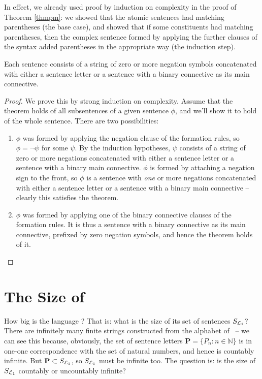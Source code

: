 In effect, we already used proof by induction on complexity in the proof of Theorem \ref{thmpm}: we showed that the atomic sentences had matching parentheses (the base case), and showed that if some constituents had matching parentheses, then the complex sentence formed by applying the further clauses of the syntax added parentheses in the appropriate way (the induction step). 

\begin{theorem}
Each sentence consists of a string of zero or more negation symbols concatenated with either a sentence letter or a sentence with a binary connective as its main connective.
\begin{proof}
	We prove this by strong induction on complexity. Assume that the theorem holds of all subsentences of a given sentence $\phi$, and we'll show it to hold of the whole sentence. There are two possibilities: \begin{enumerate}
		\item $\phi$ was formed by applying the negation clause of the formation rules, so $\phi = \neg\psi$ for some $\psi$. By the induction hypotheses, $\psi$ consists of a string of zero or more negations concatenated with either a sentence letter or a sentence with a binary main connective. $\phi$ is formed by attaching a negation sign to the front, so $\phi$ is a sentence with \emph{one} or more negations concatenated with either a sentence letter or a sentence with a binary main connective – clearly this satisfies the theorem.
		\item $\phi$ was formed by applying one of the binary connective clauses of the formation rules. It is thus a sentence with a binary connective as its main connective, prefixed by zero negation symbols, and hence the theorem holds of it.
	\end{enumerate}	
\end{proof}\end{theorem}



\section{The Size of \lone}

How big is the language \lone? That is: what is the size of its set of sentences $S_{\mathcal{L}_{1}}$? There are infinitely many finite strings constructed from the alphabet of \lone\ – we can see this because, obviously, the set of sentence letters $\mathbf{P}=\{P_{n}:n \in \mathbb{N}\}$ is in one-one correspondence with the set of natural numbers, and hence is countably infinite. But $\mathbf{P}\subset S_{\mathcal{L}_{1}}$, so $S_{\mathcal{L}_{1}}$ must be infinite too. The question is: is the size of $S_{\mathcal{L}_{1}}$ countably or uncountably infinite?

